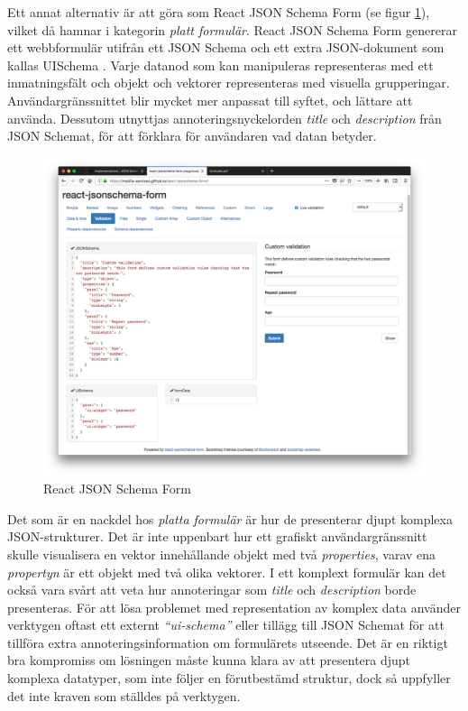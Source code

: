 Ett annat alternativ är att göra som React JSON Schema Form (se figur \ref{fig:react-jsonschema-form}), vilket då hamnar i kategorin \textit{platt formulär}. React JSON Schema Form genererar ett webbformulär utifrån ett JSON Schema och ett extra JSON-dokument som kallas UISchema \cite{MozillaServices}. Varje datanod som kan manipuleras representeras med ett inmatningsfält och objekt och vektorer representeras med visuella grupperingar. Användargränssnittet blir mycket mer anpassat till syftet, och lättare att använda. Dessutom utnyttjas annoteringsnyckelorden \textit{title} och \textit{description} från JSON Schemat, för att förklara för användaren vad datan betyder.

\begin{figure}
	\includegraphics[width=\textwidth]{./images/screenshot-react-jsonschema-form.png}
	\vspace{-1.7em}
	\caption{React JSON Schema Form \cite{MozillaServices}}
	\label{fig:react-jsonschema-form}
\end{figure}

Det som är en nackdel hos \textit{platta formulär} är hur de presenterar djupt komplexa JSON-strukturer. Det är inte uppenbart hur ett grafiskt användargränssnitt skulle visualisera en vektor innehållande objekt med två \textit{properties}, varav ena \textit{propertyn} är ett objekt med två olika vektorer. I ett komplext formulär kan det också vara svårt att veta hur annoteringar som \textit{title} och \textit{description} borde presenteras. För att lösa problemet med representation av komplex data använder verktygen oftast ett externt \textit{``ui-schema''} eller tillägg till JSON Schemat för att tillföra extra annoteringsinformation om formulärets utseende. Det är en riktigt bra kompromiss om lösningen måste kunna klara av att presentera djupt komplexa datatyper, som inte följer en förutbestämd struktur, dock så uppfyller det inte kraven som ställdes på verktygen.


